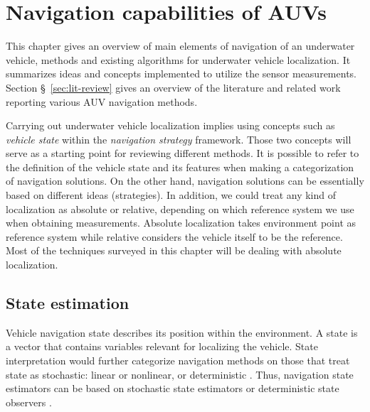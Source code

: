 \chapter{Navigation capabilities of AUVs} \label{chap:capabilities}
This chapter gives an overview of main elements of navigation of an underwater vehicle, methods and existing algorithms for underwater vehicle localization. It summarizes ideas and concepts implemented to utilize the sensor measurements. Section \S~\ref{sec:lit-review}  gives an overview of the literature and related work reporting various AUV navigation methods. 

Carrying out underwater vehicle localization implies using concepts such as \textit{vehicle state} within the \textit{navigation strategy} framework. Those two concepts will serve as a starting point for reviewing different methods. It is possible to refer to the definition of the vehicle state and its features when making a categorization of navigation solutions. On the other hand, navigation solutions can be essentially based on different ideas (strategies). In addition, we could treat any kind of localization as absolute or relative, depending on which reference system we use when obtaining measurements. Absolute localization takes environment point as reference system while relative considers the vehicle itself to be the reference. Most of the techniques surveyed in this chapter will be dealing with absolute localization. 
\section{State estimation}
Vehicle navigation state describes its position within the environment. A state is a vector that contains variables relevant for localizing the vehicle. State interpretation would further categorize navigation methods on those that treat state as stochastic: linear or nonlinear, or deterministic \cite{kinsey06}. Thus, navigation state estimators can be based on stochastic state estimators or deterministic state observers \cite{kinsey06}.

